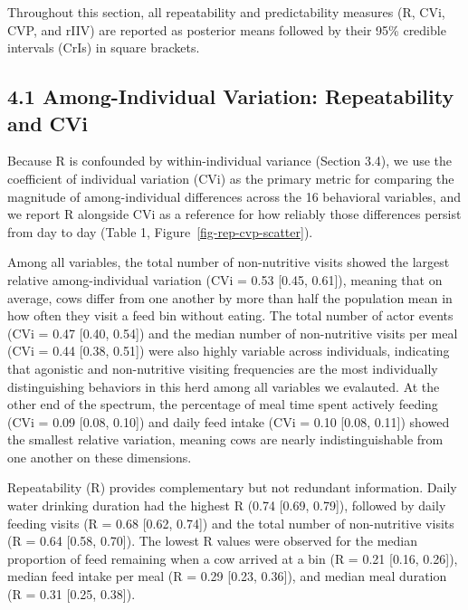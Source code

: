\documentclass[
]{article}
\begin{document}
Throughout this section, all repeatability and predictability measures
(R, CVi, CVP, and rIIV) are reported as posterior means followed by
their 95\% credible intervals (CrIs) in square brackets.

\subsection{4.1 Among-Individual Variation: Repeatability and
CVi}\label{among-individual-variation-repeatability-and-cvi}

Because R is confounded by within-individual variance (Section 3.4), we
use the coefficient of individual variation (CVi) as the primary metric
for comparing the magnitude of among-individual differences across the
16 behavioral variables, and we report R alongside CVi as a reference
for how reliably those differences persist from day to day (Table 1,
Figure~\ref{fig-rep-cvp-scatter}).

Among all variables, the total number of non-nutritive visits showed the
largest relative among-individual variation (CVi = 0.53 {[}0.45,
0.61{]}), meaning that on average, cows differ from one another by more
than half the population mean in how often they visit a feed bin without
eating. The total number of actor events (CVi = 0.47 {[}0.40, 0.54{]})
and the median number of non-nutritive visits per meal (CVi = 0.44
{[}0.38, 0.51{]}) were also highly variable across individuals,
indicating that agonistic and non-nutritive visiting frequencies are the
most individually distinguishing behaviors in this herd among all
variables we evalauted. At the other end of the spectrum, the percentage
of meal time spent actively feeding (CVi = 0.09 {[}0.08, 0.10{]}) and
daily feed intake (CVi = 0.10 {[}0.08, 0.11{]}) showed the smallest
relative variation, meaning cows are nearly indistinguishable from one
another on these dimensions.

Repeatability (R) provides complementary but not redundant information.
Daily water drinking duration had the highest R (0.74 {[}0.69, 0.79{]}),
followed by daily feeding visits (R = 0.68 {[}0.62, 0.74{]}) and the
total number of non-nutritive visits (R = 0.64 {[}0.58, 0.70{]}). The
lowest R values were observed for the median proportion of feed
remaining when a cow arrived at a bin (R = 0.21 {[}0.16, 0.26{]}),
median feed intake per meal (R = 0.29 {[}0.23, 0.36{]}), and median meal
duration (R = 0.31 {[}0.25, 0.38{]}).
\end{document}
